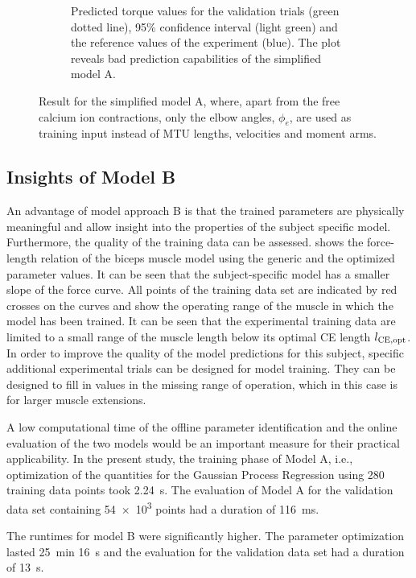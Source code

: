 \begin{figure}
\begin{subfigure}[t]{0.48\textwidth}
    \caption{Predicted torque values for the validation trials (green dotted line), 95\% confidence interval (light green) and the reference values of the experiment (blue). The plot reveals bad prediction capabilities of the simplified model A.}%
    \label{fig:measured_optimized_torque_A3}%
  \end{subfigure}%
  \caption{Result for the simplified model A, where, apart from the free calcium ion contractions, only the elbow angles, $\phi_e$, are used as training input instead of MTU lengths, velocities and moment arms.}
  \label{fig:measured_optimized_A2}%
\end{figure}%

\subsection{Insights of Model B}\label{ref:res_insights_b}
An advantage of model approach B is that the trained parameters are physically meaningful and allow insight into the properties of the subject specific model. Furthermore, the quality of the training data can be assessed.  shows the force-length relation of the biceps muscle model using the generic and the optimized parameter values. It can be seen that the subject-specific model has a smaller slope of the force curve. 
All points of the training data set are indicated by red crosses on the curves and show the operating range of the muscle in which the model has been trained. It can be seen that the experimental training data are limited to a small range of the muscle length below its optimal CE length $l_{\text{CE},\text{opt}}$. In order to improve the quality of the model predictions for this subject, specific additional experimental trials can be designed for model training. They can be designed to fill in values in the missing range of operation, which in this case is for larger muscle extensions.

A low computational time of the offline parameter identification and the online evaluation of the two models would be an important measure for their practical applicability. In the present study, the training phase of Model A, i.e., optimization of the quantities for the Gaussian Process Regression using 280 training data points took \SI{2.24}{\second}. The evaluation of Model A for the validation data set containing \num{54e3} points had a duration of \SI{116}{\milli\second}.

The runtimes for model B were significantly higher. The parameter optimization lasted \SI{25}{\minute} \SI{16}{\second} and the evaluation for the validation data set had a duration of \SI{13}{\second}.

